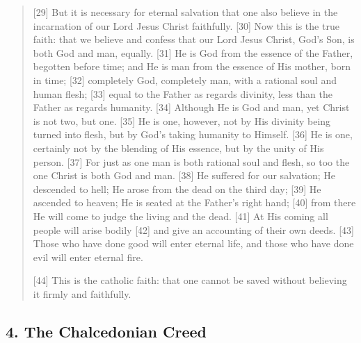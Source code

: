 \documentclass[
]{book}
\begin{document}
\begin{quote}
{[}29{]} But it is necessary for eternal salvation that one also believe in the incarnation of our Lord Jesus Christ faithfully. {[}30{]} Now this is the true faith: that we believe and confess that our Lord Jesus Christ, God's Son, is both God and man, equally. {[}31{]} He is God from the essence of the Father, begotten before time; and He is man from the essence of His mother, born in time; {[}32{]} completely God, completely man, with a rational soul and human flesh; {[}33{]} equal to the Father as regards divinity, less than the Father as regards humanity. {[}34{]} Although He is God and man, yet Christ is not two, but one. {[}35{]} He is one, however, not by His divinity being turned into flesh, but by God's taking humanity to Himself. {[}36{]} He is one, certainly not by the blending of His essence, but by the unity of His person. {[}37{]} For just as one man is both rational soul and flesh, so too the one Christ is both God and man. {[}38{]} He suffered for our salvation; He descended to hell; He arose from the dead on the third day; {[}39{]} He ascended to heaven; He is seated at the Father's right hand; {[}40{]} from there He will come to judge the living and the dead. {[}41{]} At His coming all people will arise bodily {[}42{]} and give an accounting of their own deeds. {[}43{]} Those who have done good will enter eternal life, and those who have done evil will enter eternal fire.

{[}44{]} This is the catholic faith: that one cannot be saved without believing it firmly and faithfully.
\end{quote}

\hypertarget{the-chalcedonian-creed}{%
\subsection*{\texorpdfstring{4. \textbf{The Chalcedonian Creed}}{4. The Chalcedonian Creed}}\label{the-chalcedonian-creed}}
\end{document}
